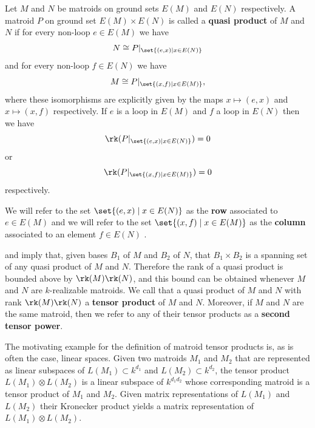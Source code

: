     \begin{definition}\label{def:tensorproduct}
    Let $M$ and $N$ be matroids on ground sets $E(M)$ and $E(N)$ respectively. A matroid $P$ on ground set $E(M)\times E(N)$ is called a \textbf{quasi product} of $M$ and $N$ if for every non-loop $e\in E(M)$ we have
    \begin{equation} \label{eqn:tensorRight}
        N\cong P|_{\set{(e,x)\mid x\in E(N)}}
    \end{equation}
    and for every non-loop $f\in E(N)$ we have
    \begin{equation}\label{eqn:tensorLeft}
        M\cong P|_{\set{(x,f)\mid x\in E(M)}},
    \end{equation}
    where these isomorphisms are explicitly given by the maps $x\mapsto (e,x)$ and $x\mapsto (x,f)$ respectively. If $e$ is a loop in $E(M)$ and $f$ a loop in $E(N)$ then we have
    \begin{equation}\label{eqn:tensorRight0}
        \rk(P|_{\set{(e,x)\mid x\in E(N)}})=0
    \end{equation}
    or
    \begin{equation}\label{eqn:tensorLeft0}
    \rk(P|_{\set{(x,f)\mid x\in E(M)}})=0
    \end{equation}
    respectively.

    We will refer to the set $\set{(e,x)\mid x\in E(N)}$ as the \textbf{row} associated to $e\in E(M)$ and we will refer to the set $\set{(x,f)\mid x\in E(M)}$ as the \textbf{column} associated to an element $f\in E(N)$ .
    \end{definition}
    
     and  imply that, given bases $B_1$ of $M$ and $B_2$ of $N$, that $B_1\times B_2$ is a spanning set of any quasi product of $M$ and $N$. Therefore the rank of a quasi product is bounded above by $\rk(M)\rk(N)$, and this bound can be obtained whenever $M$ and $N$ are $k$-realizable matroids. We call that a quasi product of $M$ and $N$ with rank $\rk(M)\rk(N)$ a \textbf{tensor product} of $M$ and $N$. Moreover, if $M$ and $N$ are the same matroid, then we refer to any of their tensor products as a \textbf{second tensor power}.

       
    The motivating example for the definition of matroid tensor products is, as is often the case, linear spaces. Given two matroids $M_1$ and $M_2$ that are represented as linear subspaces of $L(M_1)\subset k^{d_1}$ and $L(M_2)\subset k^{d_2}$, the tensor product $L(M_1)\otimes L(M_2)$ is a linear subspace of $k^{d_1d_2}$ whose corresponding matroid is a tensor product of $M_1$ and $M_2$. Given matrix representations of $L(M_1)$ and $L(M_2)$ their Kronecker product yields a matrix representation of $L(M_1)\otimes L(M_2)$.
    
